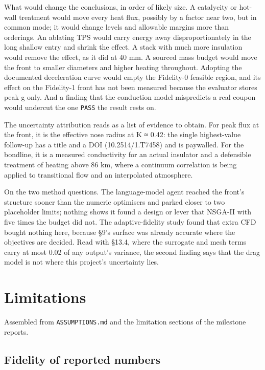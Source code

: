 \documentclass[
  a4paper,
  11pt]{article}
\begin{document}
What would change the conclusions, in order of likely size. A catalycity
or hot-wall treatment would move every heat flux, possibly by a factor
near two, but in common mode; it would change levels and allowable
margins more than orderings. An ablating TPS would carry energy away
disproportionately in the long shallow entry and shrink the effect. A
stack with much more insulation would remove the effect, as it did at 40
mm. A sourced mass budget would move the front to smaller diameters and
higher heating throughout. Adopting the documented deceleration curve
would empty the Fidelity-0 feasible region, and its effect on the
Fidelity-1 front has not been measured because the evaluator stores peak
g only. And a finding that the conduction model mispredicts a real
coupon would undercut the one \texttt{PASS} the result rests on.

The uncertainty attribution reads as a list of evidence to obtain. For
peak flux at the front, it is the effective nose radius at K ≈ 0.42: the
single highest-value follow-up has a title and a DOI (10.2514/1.T7458)
and is paywalled. For the bondline, it is a measured conductivity for an
actual insulator and a defensible treatment of heating above 86 km,
where a continuum correlation is being applied to transitional flow and
an interpolated atmosphere.

On the two method questions. The language-model agent reached the
front's structure sooner than the numeric optimisers and parked closer
to two placeholder limits; nothing shows it found a design or lever that
NSGA-II with five times the budget did not. The adaptive-fidelity study
found that extra CFD bought nothing here, because §9's surface was
already accurate where the objectives are decided. Read with §13.4,
where the surrogate and mesh terms carry at most 0.02 of any output's
variance, the second finding says that the drag model is not where this
project's uncertainty lies.

\section{Limitations}

Assembled from \texttt{ASSUMPTIONS.md} and the limitation sections of
the milestone reports.

\subsection{Fidelity of reported numbers}
\end{document}
